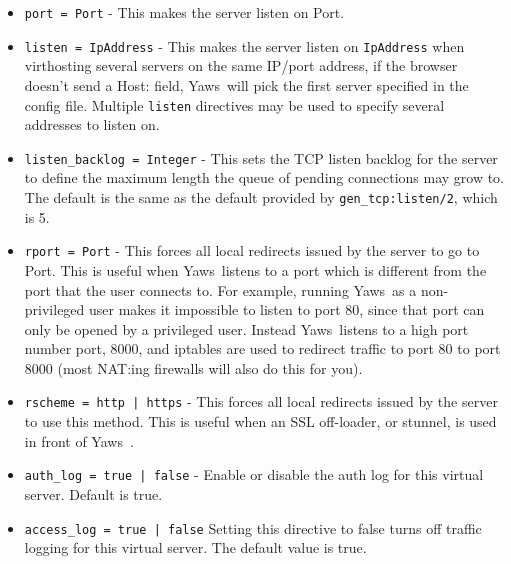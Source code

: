 \documentclass[11pt,oneside,english]{book}
\newcommand{\Yaws}            %
        {{\sc Yaws}}
\begin{document}
\begin{itemize}

\item       \verb+port = Port+ -
              This makes the server listen on Port.

\item        \verb+listen = IpAddress+ -
              This makes the  server  listen  on  \verb+IpAddress+  when
              virthosting  several  servers  on  the same IP/port
              address, if the browser doesn't send a Host: field,
              \Yaws\   will  pick  the first server specified in the
              config file.
              Multiple \verb+listen+ directives may be used to specify
              several addresses to listen on.

\item        \verb+listen_backlog = Integer+ -
              This sets the TCP listen backlog for the server to
              define the maximum length the queue of pending
              connections may grow to. The default is the same as
              the default provided by \verb+gen_tcp:listen/2+, which
              is 5.

\item       \verb+rport = Port+ -
              This forces  all  local  redirects  issued  by  the
              server  to  go  to  Port.  This is useful when \Yaws\
              listens to a port which is different from the  port
              that  the  user  connects  to. For example, running
              \Yaws\  as a non-privileged user makes  it  impossible
              to  listen  to port 80, since that port can only be
              opened by a privileged user. Instead  \Yaws\   listens
              to  a high port number port, 8000, and iptables are
              used to redirect traffic to port 80  to  port  8000
              (most NAT:ing firewalls will also do this for you).

\item       \verb+rscheme = http | https+ -
              This forces  all  local  redirects  issued  by  the
              server  to  use this method. This is useful when an
              SSL off-loader, or stunnel, is  used  in  front  of
              \Yaws\ .

\item       \verb+auth_log = true | false+ -
              Enable or disable the auth log for this virtual server.
              Default is true.

\item       \verb+access_log = true | false+
              Setting  this  directive  to  false turns off
              traffic logging for this virtual server. The
              default value is true.


\end{itemize}
\end{document}

